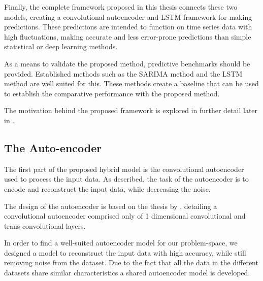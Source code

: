 Finally, the complete framework proposed in this thesis connects these two models,
creating a convolutional autoencoder and LSTM framework for making predictions.
These predictions are intended to function on time series data with high fluctuations,
making accurate and less error-prone predictions than simple statistical or deep learning methods.


As a means to validate the proposed method, predictive benchmarks should be provided.
Established methods such as the SARIMA method and the LSTM method are well suited for this.
These methods create a baseline that can be used to establish the comparative performance with the proposed method.

The motivation behind the proposed framework is explored in further detail later in .



\subsection{The Auto-encoder}

The first part of the proposed hybrid model is the convolutional autoencoder used to process the input data.
As described, the task of the autoencoder is to encode and reconstruct the input data,
while decreasing the noise.

The design of the autoencoder is based on the thesis by \cite{Zhao2019},
detailing a convolutional autoencoder comprised only of 1 dimensional convolutional and trans-convolutional layers.


In order to find a well-suited autoencoder model for our problem-space,
we designed a model to reconstruct the input data with high accuracy,
while still removing noise from the dataset.
Due to the fact that all the data in the different datasets share similar characteristics
a shared autoencoder model is developed.




